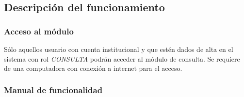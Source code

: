 \documentclass[../reportesINE.tex]{subfiles}
\begin{document}
\subsection{Descripción del funcionamiento}

\subsubsection{Acceso al módulo}
Sólo aquellos usuario con cuenta institucional y que estén dados de alta en el sistema con rol \textit{CONSULTA} podrán acceder al módulo de consulta. Se requiere de una computadora con conexión a internet para el acceso. 

\subsubsection{Manual de funcionalidad}
\end{document}

